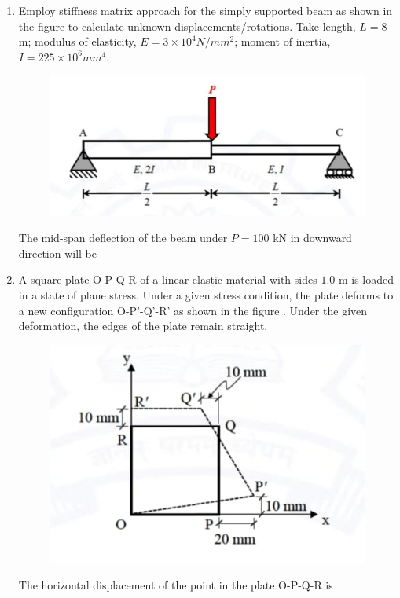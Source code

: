 \documentclass[journal,12pt,onecolumn]{article}
\theoremstyle{remark}
\begin{document}
\begin{enumerate}
\hfill{}

\item Employ stiffness matrix approach for the simply supported beam as shown in the figure  to calculate unknown displacements/rotations. Take length, $L=8$ m; modulus of elasticity, $E = 3 \times 10^4 N/mm^2$; moment of inertia, $I = 225 \times 10^6 mm^4$.
\begin{figure}[H]
    \centering
    \includegraphics[width=0.7\columnwidth]{figs/1q41.jpg}
    \caption{}
    \label{fig:q41}
\end{figure}
The mid-span deflection of the beam  under $P = 100$ kN in downward direction will be \underline{\hspace{2cm}}

\hfill{}

\item A square plate O-P-Q-R of a linear elastic material with sides $1.0$ m is loaded in a state of plane stress. Under a given stress condition, the plate deforms to a new configuration O-P'-Q'-R' as shown in the figure . Under the given deformation, the edges of the plate remain straight.
\begin{figure}[H]
    \centering
    \includegraphics[width=0.7\columnwidth]{figs/1q42.jpg}
    \caption{}
    \label{fig:q42}
\end{figure}
The horizontal displacement of the point  in the plate O-P-Q-R  is \underline{\hspace{2cm}}


\end{enumerate}
\end{document}
